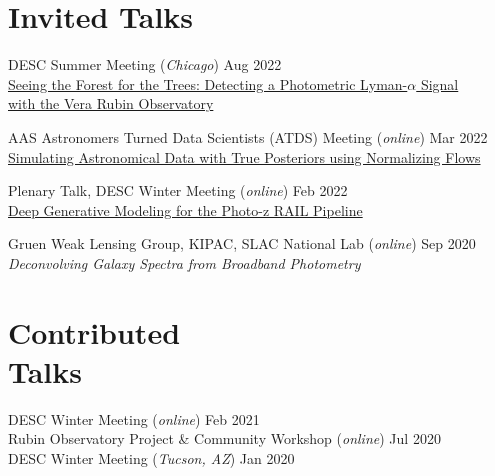 \documentclass[margin, 11pt]{res}
\begin{document}
\begin{resume}
\section{Invited Talks}

\hangindent=2mm
DESC Summer Meeting (\textit{Chicago}) \hfill Aug 2022 \\
\href{https://docs.google.com/presentation/d/1XIaaf1TzgIAM4Hg7VIUtnKwvI75EPUbHzXDIjFfOA2o/edit?usp=sharing}{Seeing the Forest for the Trees: Detecting a Photometric Lyman-$\alpha$ Signal \\with the Vera Rubin Observatory}

\vspace{-3.5mm} \hangindent=2mm
AAS Astronomers Turned Data Scientists (ATDS) Meeting (\textit{online}) \hfill Mar 2022 \\
\href{https://docs.google.com/presentation/d/18cWynQW9p8bEPS6NMueZ4mKaEEmNdxUPhsXArGV5Cb8/edit?usp=sharing}{Simulating Astronomical Data with True Posteriors using Normalizing Flows}

\vspace{-3.5mm} \hangindent=2mm
Plenary Talk, DESC Winter Meeting (\textit{online}) \hfill Feb 2022 \\ \href{https://docs.google.com/presentation/d/179O1gnQpVfbIwZLfi7TlW8gYhP3K4MFBbi_8lAighNs/edit?usp=sharing}{Deep Generative Modeling for the Photo-z RAIL Pipeline}

\vspace{-3.5mm} \hangindent=2mm
Gruen Weak Lensing Group, KIPAC, SLAC National Lab (\textit{online}) \hfill Sep 2020 \\ \textit{Deconvolving Galaxy Spectra from Broadband Photometry} \\

\section{Contributed \\Talks}

DESC Winter Meeting (\textit{online}) \hfill Feb 2021 \\
Rubin Observatory Project \& Community Workshop (\textit{online}) \hfill Jul 2020 \\
DESC Winter Meeting (\textit{Tucson, AZ}) \hfill Jan 2020 \\


\end{resume}
\end{document}
